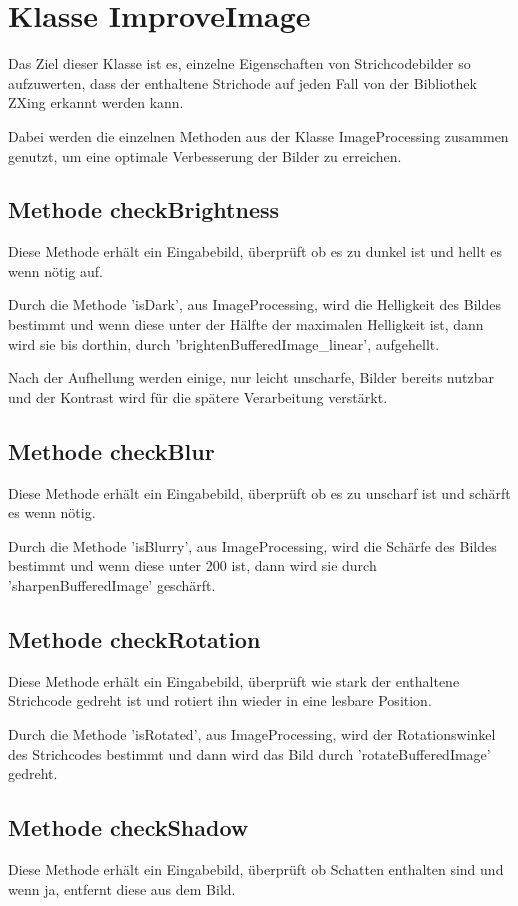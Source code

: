 \section{Klasse ImproveImage}
\writtenby{\dcauthornameriren}%
Das Ziel dieser Klasse ist es, einzelne Eigenschaften von Strichcodebilder so aufzuwerten, dass der enthaltene Strichode auf jeden Fall von der Bibliothek ZXing erkannt werden kann.

Dabei werden die einzelnen Methoden aus der Klasse ImageProcessing zusammen genutzt, um eine optimale Verbesserung der Bilder zu erreichen.


\subsection*{Methode checkBrightness}
Diese Methode erhält ein Eingabebild, überprüft ob es zu dunkel ist und hellt es wenn nötig auf.

Durch die Methode 'isDark', aus ImageProcessing, wird die Helligkeit des Bildes bestimmt und wenn diese unter der Hälfte der maximalen Helligkeit ist, dann wird sie bis dorthin, durch 'brightenBufferedImage\_linear', aufgehellt.

Nach der Aufhellung werden einige, nur leicht unscharfe, Bilder bereits nutzbar und der Kontrast wird für die spätere Verarbeitung verstärkt.


\subsection*{Methode checkBlur}
Diese Methode erhält ein Eingabebild, überprüft ob es zu unscharf ist und schärft es wenn nötig.

Durch die Methode 'isBlurry', aus ImageProcessing, wird die Schärfe des Bildes bestimmt und wenn diese unter 200 ist, dann wird sie durch 'sharpenBufferedImage' geschärft.


\subsection*{Methode checkRotation}
Diese Methode erhält ein Eingabebild, überprüft wie stark der enthaltene Strichcode gedreht ist und rotiert ihn wieder in eine lesbare Position.

Durch die Methode 'isRotated', aus ImageProcessing, wird der Rotationswinkel des Strichcodes bestimmt und dann wird das Bild durch 'rotateBufferedImage' gedreht.


\subsection*{Methode checkShadow}
Diese Methode erhält ein Eingabebild, überprüft ob Schatten enthalten sind und wenn ja, entfernt diese aus dem Bild.

